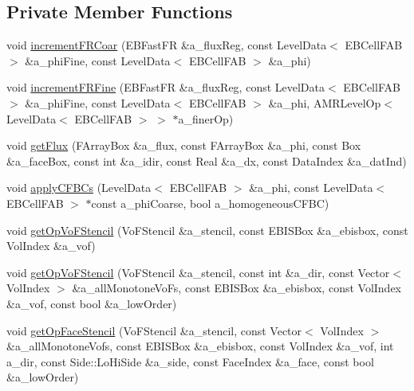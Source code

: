 \subsection*{Private Member Functions}
\begin{DoxyCompactItemize}
\item 
void \hyperlink{classebconductivityop_a1a00026c4e704fcb8716fcd985d2a232}{increment\+F\+R\+Coar} (E\+B\+Fast\+FR \&a\+\_\+flux\+Reg, const Level\+Data$<$ E\+B\+Cell\+F\+AB $>$ \&a\+\_\+phi\+Fine, const Level\+Data$<$ E\+B\+Cell\+F\+AB $>$ \&a\+\_\+phi)
\item 
void \hyperlink{classebconductivityop_a852fdf6e9456bb846227dc468ab85d2b}{increment\+F\+R\+Fine} (E\+B\+Fast\+FR \&a\+\_\+flux\+Reg, const Level\+Data$<$ E\+B\+Cell\+F\+AB $>$ \&a\+\_\+phi\+Fine, const Level\+Data$<$ E\+B\+Cell\+F\+AB $>$ \&a\+\_\+phi, A\+M\+R\+Level\+Op$<$ Level\+Data$<$ E\+B\+Cell\+F\+AB $>$ $>$ $\ast$a\+\_\+finer\+Op)
\item 
void \hyperlink{classebconductivityop_aace549a94cdbb7ee86f6b94b3611ab9a}{get\+Flux} (F\+Array\+Box \&a\+\_\+flux, const F\+Array\+Box \&a\+\_\+phi, const Box \&a\+\_\+face\+Box, const int \&a\+\_\+idir, const Real \&a\+\_\+dx, const Data\+Index \&a\+\_\+dat\+Ind)
\item 
void \hyperlink{classebconductivityop_a8bdf48fb0c064e42a79f0aaedfebd01a}{apply\+C\+F\+B\+Cs} (Level\+Data$<$ E\+B\+Cell\+F\+AB $>$ \&a\+\_\+phi, const Level\+Data$<$ E\+B\+Cell\+F\+AB $>$ $\ast$const a\+\_\+phi\+Coarse, bool a\+\_\+homogeneous\+C\+F\+BC)
\item 
void \hyperlink{classebconductivityop_aff704c5f6c5db5963d5dbefb9f8fbdd1}{get\+Op\+Vo\+F\+Stencil} (Vo\+F\+Stencil \&a\+\_\+stencil, const E\+B\+I\+S\+Box \&a\+\_\+ebisbox, const Vol\+Index \&a\+\_\+vof)
\item 
void \hyperlink{classebconductivityop_a7b4c2689ce88dbf3f9ed233f3895c801}{get\+Op\+Vo\+F\+Stencil} (Vo\+F\+Stencil \&a\+\_\+stencil, const int \&a\+\_\+dir, const Vector$<$ Vol\+Index $>$ \&a\+\_\+all\+Monotone\+Vo\+Fs, const E\+B\+I\+S\+Box \&a\+\_\+ebisbox, const Vol\+Index \&a\+\_\+vof, const bool \&a\+\_\+low\+Order)
\item 
void \hyperlink{classebconductivityop_a81a2a3d0d8592e241dfff95a19983b9e}{get\+Op\+Face\+Stencil} (Vo\+F\+Stencil \&a\+\_\+stencil, const Vector$<$ Vol\+Index $>$ \&a\+\_\+all\+Monotone\+Vofs, const E\+B\+I\+S\+Box \&a\+\_\+ebisbox, const Vol\+Index \&a\+\_\+vof, int a\+\_\+dir, const Side\+::\+Lo\+Hi\+Side \&a\+\_\+side, const Face\+Index \&a\+\_\+face, const bool \&a\+\_\+low\+Order)

\end{DoxyCompactItemize}
